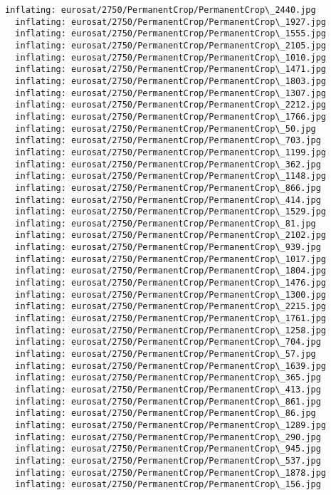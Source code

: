 \documentclass[11pt]{article}
\begin{document}
\begin{Verbatim}[commandchars=\\\{\}]
  inflating: eurosat/2750/PermanentCrop/PermanentCrop\_2440.jpg
  inflating: eurosat/2750/PermanentCrop/PermanentCrop\_1927.jpg
  inflating: eurosat/2750/PermanentCrop/PermanentCrop\_1555.jpg
  inflating: eurosat/2750/PermanentCrop/PermanentCrop\_2105.jpg
  inflating: eurosat/2750/PermanentCrop/PermanentCrop\_1010.jpg
  inflating: eurosat/2750/PermanentCrop/PermanentCrop\_1471.jpg
  inflating: eurosat/2750/PermanentCrop/PermanentCrop\_1803.jpg
  inflating: eurosat/2750/PermanentCrop/PermanentCrop\_1307.jpg
  inflating: eurosat/2750/PermanentCrop/PermanentCrop\_2212.jpg
  inflating: eurosat/2750/PermanentCrop/PermanentCrop\_1766.jpg
  inflating: eurosat/2750/PermanentCrop/PermanentCrop\_50.jpg
  inflating: eurosat/2750/PermanentCrop/PermanentCrop\_703.jpg
  inflating: eurosat/2750/PermanentCrop/PermanentCrop\_1199.jpg
  inflating: eurosat/2750/PermanentCrop/PermanentCrop\_362.jpg
  inflating: eurosat/2750/PermanentCrop/PermanentCrop\_1148.jpg
  inflating: eurosat/2750/PermanentCrop/PermanentCrop\_866.jpg
  inflating: eurosat/2750/PermanentCrop/PermanentCrop\_414.jpg
  inflating: eurosat/2750/PermanentCrop/PermanentCrop\_1529.jpg
  inflating: eurosat/2750/PermanentCrop/PermanentCrop\_81.jpg
  inflating: eurosat/2750/PermanentCrop/PermanentCrop\_2102.jpg
  inflating: eurosat/2750/PermanentCrop/PermanentCrop\_939.jpg
  inflating: eurosat/2750/PermanentCrop/PermanentCrop\_1017.jpg
  inflating: eurosat/2750/PermanentCrop/PermanentCrop\_1804.jpg
  inflating: eurosat/2750/PermanentCrop/PermanentCrop\_1476.jpg
  inflating: eurosat/2750/PermanentCrop/PermanentCrop\_1300.jpg
  inflating: eurosat/2750/PermanentCrop/PermanentCrop\_2215.jpg
  inflating: eurosat/2750/PermanentCrop/PermanentCrop\_1761.jpg
  inflating: eurosat/2750/PermanentCrop/PermanentCrop\_1258.jpg
  inflating: eurosat/2750/PermanentCrop/PermanentCrop\_704.jpg
  inflating: eurosat/2750/PermanentCrop/PermanentCrop\_57.jpg
  inflating: eurosat/2750/PermanentCrop/PermanentCrop\_1639.jpg
  inflating: eurosat/2750/PermanentCrop/PermanentCrop\_365.jpg
  inflating: eurosat/2750/PermanentCrop/PermanentCrop\_413.jpg
  inflating: eurosat/2750/PermanentCrop/PermanentCrop\_861.jpg
  inflating: eurosat/2750/PermanentCrop/PermanentCrop\_86.jpg
  inflating: eurosat/2750/PermanentCrop/PermanentCrop\_1289.jpg
  inflating: eurosat/2750/PermanentCrop/PermanentCrop\_290.jpg
  inflating: eurosat/2750/PermanentCrop/PermanentCrop\_945.jpg
  inflating: eurosat/2750/PermanentCrop/PermanentCrop\_537.jpg
  inflating: eurosat/2750/PermanentCrop/PermanentCrop\_1878.jpg
  inflating: eurosat/2750/PermanentCrop/PermanentCrop\_156.jpg

\end{Verbatim}
\end{document}
